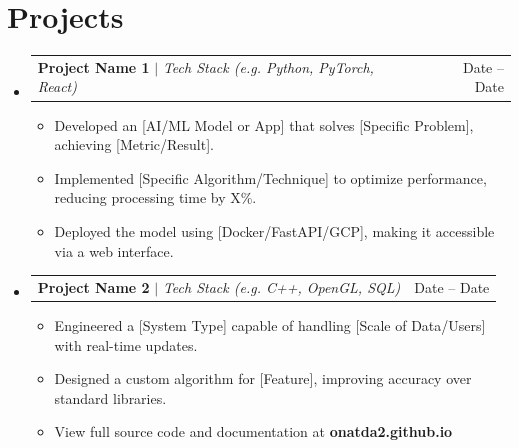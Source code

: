 \documentclass[letterpaper,11pt]{article}
\makeatletter
\newcommand{\resumeItem}[1]{
  \item\small{
    {#1 \vspace{-2pt}}
  }
}
\newcommand{\resumeProjectHeading}[2]{
    \item
    \begin{tabular*}{0.97\textwidth}{l@{\extracolsep{\fill}}r}
      \small#1 & #2 \\
    \end{tabular*}\vspace{-7pt}
}
\newcommand{\resumeSubHeadingListStart}{\begin{itemize}[leftmargin=0.15in, label={}]}
\newcommand{\resumeSubHeadingListEnd}{\end{itemize}}
\newcommand{\resumeItemListStart}{\begin{itemize}}
\newcommand{\resumeItemListEnd}{\end{itemize}\vspace{-5pt}}
\makeatother
\begin{document}
\section{Projects}
    \resumeSubHeadingListStart
      \resumeProjectHeading
          {\textbf{Project Name 1} $|$ \emph{Tech Stack (e.g. Python, PyTorch, React)}}{Date -- Date}
          \resumeItemListStart
            \resumeItem{Developed an [AI/ML Model or App] that solves [Specific Problem], achieving [Metric/Result].}
            \resumeItem{Implemented [Specific Algorithm/Technique] to optimize performance, reducing processing time by X\%.}
            \resumeItem{Deployed the model using [Docker/FastAPI/GCP], making it accessible via a web interface.}
          \resumeItemListEnd
      \resumeProjectHeading
          {\textbf{Project Name 2} $|$ \emph{Tech Stack (e.g. C++, OpenGL, SQL)}}{Date -- Date}
          \resumeItemListStart
            \resumeItem{Engineered a [System Type] capable of handling [Scale of Data/Users] with real-time updates.}
            \resumeItem{Designed a custom algorithm for [Feature], improving accuracy over standard libraries.}
            \resumeItem{View full source code and documentation at \textbf{onatda2.github.io}}
          \resumeItemListEnd
    \resumeSubHeadingListEnd
\end{document}
